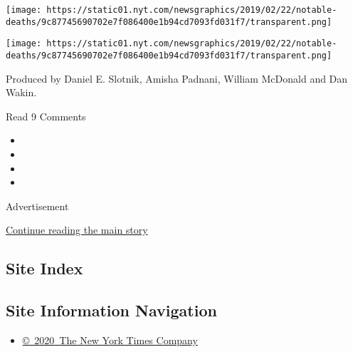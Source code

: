 \href{https://www.nytimes.com/2019/01/02/obituaries/bob-einstein-dead.html}{}

\texttt{[image: https://static01.nyt.com/newsgraphics/2019/02/22/notable-deaths/9c87745690702e7f086400e1b94cd7093fd031f7/transparent.png]}

\href{https://www.nytimes.com/2019/01/01/obituaries/judith-rich-harris-dies.html}{}

\texttt{[image: https://static01.nyt.com/newsgraphics/2019/02/22/notable-deaths/9c87745690702e7f086400e1b94cd7093fd031f7/transparent.png]}

Produced by Daniel E. Slotnik, Amisha Padnani, William McDonald and Dan
Wakin.

Read 9 Comments

\begin{itemize}
\item
\item
\item
\item
\end{itemize}

Advertisement

\protect\hyperlink{after-bottom}{Continue reading the main story}

\hypertarget{site-index}{%
\subsection{Site Index}\label{site-index}}

\hypertarget{site-information-navigation}{%
\subsection{Site Information
Navigation}\label{site-information-navigation}}

\begin{itemize}
\tightlist
\item
  \href{https://help.nytimes.com/hc/en-us/articles/115014792127-Copyright-notice}{©~2020~The
  New York Times Company}
\end{itemize}

